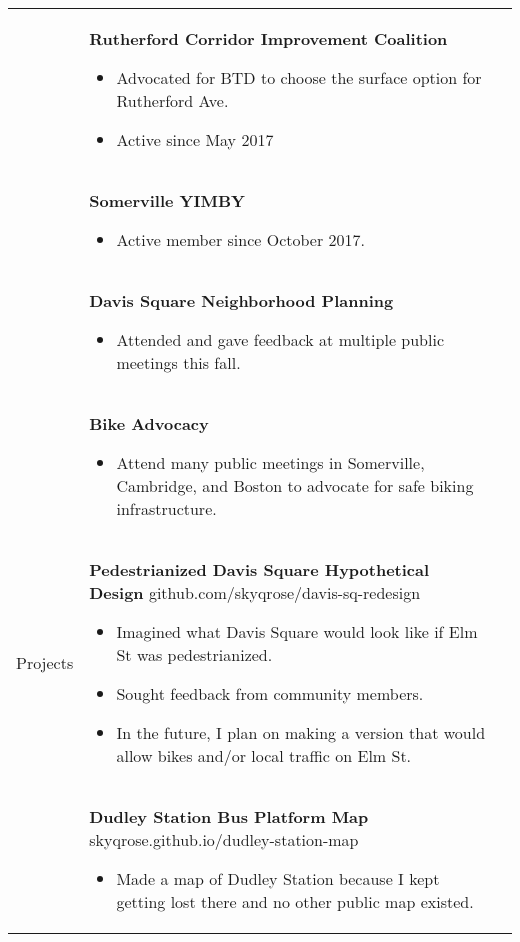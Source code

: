 \documentclass{article}
\newcommand{\sectionheading}[1]{ #1 }
\begin{document}
\begin{tabular}{ p{2.1cm} p{12.2cm} p{4cm} }
& \textbf{Rutherford Corridor Improvement Coalition}
\begin{itemize}
\item Advocated for BTD to choose the surface option for Rutherford Ave.
\item Active since May 2017
\end{itemize} \\

& \textbf{Somerville YIMBY}
\begin{itemize}
\item Active member since October 2017.
\end{itemize} \\

& \textbf{Davis Square Neighborhood Planning}
\begin{itemize}
\item Attended and gave feedback at multiple public meetings this fall.
\end{itemize} \\

& \textbf{Bike Advocacy}
\begin{itemize}
\item Attend many public meetings in Somerville, Cambridge, and Boston to advocate for safe biking infrastructure.
\end{itemize} \\

\sectionheading{Projects}
& \textbf{Pedestrianized Davis Square Hypothetical Design} \newline
github.com/skyqrose/davis-sq-redesign
\begin{itemize}
\item Imagined what Davis Square would look like if Elm St was pedestrianized.
\item Sought feedback from community members.
\item In the future, I plan on making a version that would allow bikes and/or local traffic on Elm St.
\end{itemize} \\

& \textbf{Dudley Station Bus Platform Map} \newline
skyqrose.github.io/dudley-station-map
\begin{itemize}
\item Made a map of Dudley Station because I kept getting lost there and no other public map existed.
\end{itemize} \\


\end{tabular}
\end{document}
